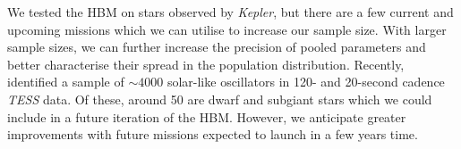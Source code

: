 


We tested the HBM on stars observed by \emph{Kepler}, but there are a few current and upcoming missions which we can utilise to increase our sample size. With larger sample sizes, we can further increase the precision of pooled parameters and better characterise their spread in the population distribution. Recently, \citet{Hatt.Nielsen.ea2023} identified a sample of \(\sim 4000\) solar-like oscillators in 120- and 20-second cadence \emph{TESS} data. Of these, around 50 are dwarf and subgiant stars which we could include in a future iteration of the HBM. However, we anticipate greater improvements with future missions expected to launch in a few years time.

